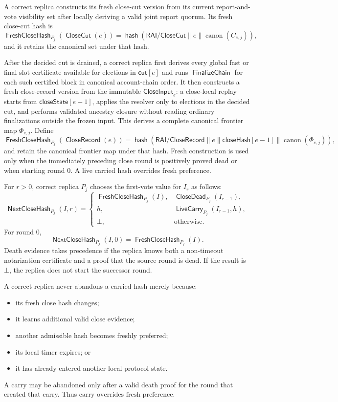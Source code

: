 \documentclass[sigplan,twocolumn,review,anonymous]{acmart}
\newcommand{\func}[1]{\operatorname{\mathsf{#1}}}
\newcommand{\hash}{\func{hash}}
\newcommand{\CloseCut}{\func{CloseCut}}
\newcommand{\CloseRecord}{\func{CloseRecord}}
\newcommand{\FreshCloseHash}{\func{FreshCloseHash}}
\newcommand{\CloseDead}{\func{CloseDead}}
\newcommand{\LiveCarry}{\func{LiveCarry}}
\newcommand{\closeHash}{\mathsf{closeHash}}
\newcommand{\FinalizeChain}{\func{FinalizeChain}}
\newcommand{\closeCut}{\mathsf{cut}}
\newcommand{\closeState}{\mathsf{closeState}}
\begin{document}
A correct replica constructs its fresh close-cut version from its current report-and-vote visibility set after
locally deriving a valid joint report quorum.  Its fresh close-cut hash is
\[
\FreshCloseHash_{P_j}(\CloseCut(e))
=
\hash(\mathsf{RAI/CloseCut}\parallel e\parallel\operatorname{canon}(C_{e,j})),
\]
and it retains the canonical set under that hash.

After the decided cut is drained, a correct replica first derives every global fast or final slot
certificate available for elections in \(\closeCut[e]\) and runs \(\FinalizeChain\) for each such
certified block in canonical account-chain order.  It then constructs a fresh close-record version from
the immutable \(\mathsf{CloseInput}_e\): a close-local replay starts from \(\closeState[e-1]\), applies
the resolver only to elections in the decided cut, and performs validated ancestry closure without
reading ordinary finalizations outside the frozen input.  This derives a complete canonical frontier
map \(\Phi_{e,j}\).  Define
\[
\FreshCloseHash_{P_j}(\CloseRecord(e))
=
\hash(\mathsf{RAI/CloseRecord}\parallel e\parallel\closeHash[e-1]
\parallel\operatorname{canon}(\Phi_{e,j})),
\]
and retain the canonical frontier map under that hash.
Fresh construction is used only when the immediately preceding close round is positively proved dead
or when starting round \(0\).  A live carried hash overrides fresh preference.

For \(r>0\), correct replica \(P_j\) chooses the first-vote value for \(I_r\) as follows:
\[
\func{NextCloseHash}_{P_j}(I,r)=
\begin{cases}
\FreshCloseHash_{P_j}(I),
  & \CloseDead_{P_j}(I_{r-1}),\\
h,
  & \LiveCarry_{P_j}(I_{r-1},h),\\
\bot,
  & \text{otherwise.}
\end{cases}
\]
For round \(0\),
\[
\func{NextCloseHash}_{P_j}(I,0)=
\FreshCloseHash_{P_j}(I).
\]
Death evidence takes precedence if the replica knows both a non-timeout notarization certificate and
a proof that the source round is dead.  If the result is \(\bot\), the replica does not start the
successor round.

A correct replica never abandons a carried hash merely because:
\begin{itemize}
\item its fresh close hash changes;
\item it learns additional valid close evidence;
\item another admissible hash becomes freshly preferred;
\item its local timer expires; or
\item it has already entered another local protocol state.
\end{itemize}
A carry may be abandoned only after a valid death proof for the round that created that carry.  Thus
\(\text{carry overrides fresh preference}\).
\end{document}
